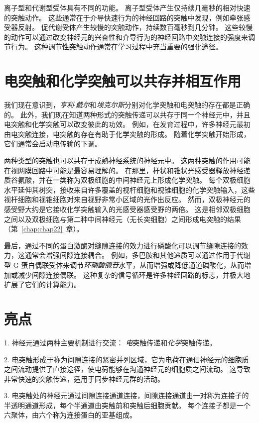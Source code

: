 离子型和代谢型受体具有不同的功能。
离子型受体产生仅持续几毫秒的相对快速的突触动作。
这些通常在于介导快速行为的神经回路的突触中发现，例如牵张感受器反射。
促代谢受体产生较慢的突触动作，持续数百毫秒到几分钟。
这些较慢的动作可以通过改变神经元的兴奋性和介导行为的神经回路中突触连接的强度来调节行为。
这种调节性突触动作通常在学习过程中充当重要的强化途径。




\section{电突触和化学突触可以共存并相互作用}

我们现在意识到，\textit{亨利$\cdot$戴尔}和\textit{埃克尔斯}分别对化学突触和电突触的存在都是正确的。
此外，我们现在知道两种形式的突触传递可以共存于同一个神经元中，并且电突触和化学突触可以改变彼此的功效。
例如，在发育过程中，许多神经元最初由电突触连接，电突触的存在有助于化学突触的形成。
随着化学突触开始形成，它们通常会启动电传输的下调。


两种类型的突触也可以共存于成熟神经系统的神经元中。 
这两种突触的作用可能在视网膜回路中可能是最容易理解的。
在那里，杆状和锥状光感受器释放神经递质谷氨酸，并在一类称为双极细胞的中间神经元上形成化学突触。
每个双极细胞水平延伸其树突，接收来自许多覆盖的视杆细胞和视锥细胞的化学突触输入，这些视杆细胞和视锥细胞对来自视野非常小区域的光作出反应。
然而，双极神经元的感受野大约是它接收化学突触输入的光感受器感受野的两倍。
这是相邻双极细胞之间以及双极细胞与第二种中间神经元（无长突细胞）之间形成电突触的结果（第~\ref{chap:chap22}~章）。


最后，通过不同的蛋白激酶对缝隙连接的效力进行磷酸化可以调节缝隙连接的效力，这通常会增强间隙连接耦合。
例如，多巴胺和其他递质可以通过作用于代谢型 G 蛋白偶联受体来调节\textit{环磷酸腺苷}水平，从而增强或降低通道磷酸化，从而增加或减少间隙连接偶联。
这种复杂的信号循环是许多神经回路的标志，并极大地扩展了它们的计算能力。



\section{亮点}

1. 神经元通过两种主要机制进行交流：
\textit{电}突触传递和\textit{化学}突触传递。


2. 电突触形成于称为间隙连接的紧密并列区域，它为电荷在通信神经元的细胞质之间流动提供了直接途径，使电荷能够在沟通神经元的细胞质之间流动。
这导致非常快速的突触传递，适用于同步神经元群的活动。 


3. 电突触处的神经元通过间隙连接通道连接，间隙连接通道由一对称为连接子的半透明通道形成，每个半通道由突触前和突触后细胞贡献。
每个连接子都是一个六聚体，由六个称为连接蛋白的亚基组成。 


